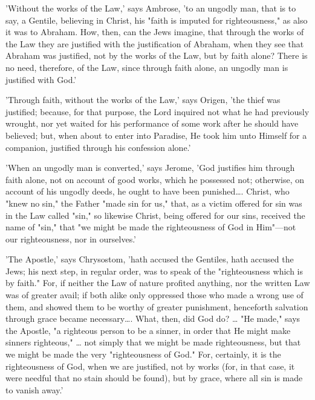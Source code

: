 \documentclass[
]{book}
\begin{document}
'Without the works of the Law,' says Ambrose, 'to an ungodly man, that is to say, a Gentile, believing in Christ, his "faith is imputed for righteousness," as also it was to Abraham. How, then, can the Jews imagine, that through the works of the Law they are justified with the justification of Abraham, when they see that Abraham was justified, not by the works of the Law, but by faith alone? There is no need, therefore, of the Law, since through faith alone, an ungodly man is justified with God.'

'Through faith, without the works of the Law,' says Origen, 'the thief was justified; because, for that purpose, the Lord inquired not what he had previously wrought, nor yet waited for his performance of some work after he should have believed; but, when about to enter into Paradise, He took him unto Himself for a companion, justified through his confession alone.'

'When an ungodly man is converted,' says Jerome, 'God justifies him through faith alone, not on account of good works, which he possessed not; otherwise, on account of his ungodly deeds, he ought to have been punished\ldots. Christ, who "knew no sin," the Father "made sin for us," that, as a victim offered for sin was in the Law called "sin," so likewise Christ, being offered for our sins, received the name of "sin," that "we might be made the righteousness of God in Him"---not our righteousness, nor in ourselves.'

'The Apostle,' says Chrysostom, 'hath accused the Gentiles, hath accused the Jews; his next step, in regular order, was to speak of the "righteousness which is by faith." For, if neither the Law of nature profited anything, nor the written Law was of greater avail; if both alike only oppressed those who made a wrong use of them, and showed them to be worthy of greater punishment, henceforth salvation through grace became necessary\ldots. What, then, did God do? \ldots{} "He made," says the Apostle, "a righteous person to be a sinner, in order that He might make sinners righteous," \ldots{} not simply that we might be made righteousness, but that we might be made the very "righteousness of God." For, certainly, it is the righteousness of God, when we are justified, not by works (for, in that case, it were needful that no stain should be found), but by grace, where all sin is made to vanish away.'
\end{document}
